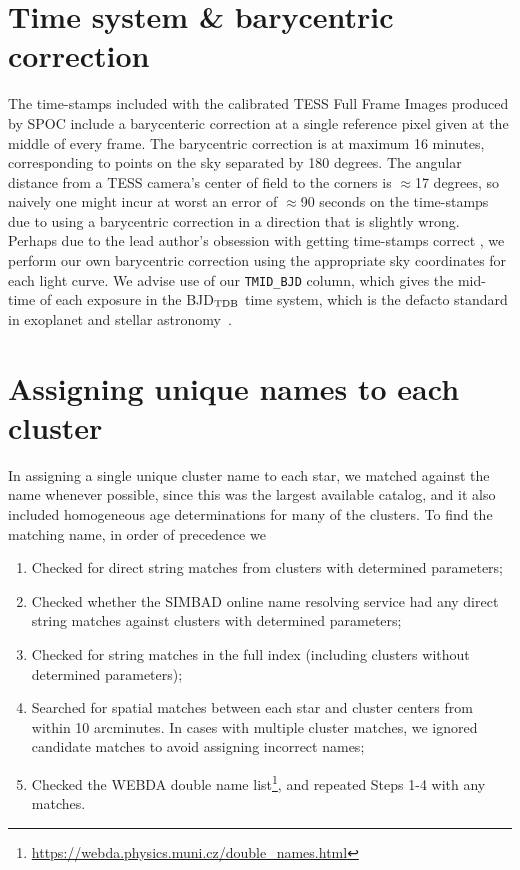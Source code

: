 \documentclass[12pt,twocolumn,tighten]{aastex62}
\begin{document}
\clearpage
\newpage

                            
 

\appendix
\section{Time system \& barycentric correction}
\label{appendix:time}

The time-stamps included with the calibrated TESS Full Frame Images
produced by SPOC include a barycenteric correction at
a single reference pixel given at the middle of every frame.
The barycentric correction is at maximum 16 minutes, corresponding to
points on the sky separated by 180 degrees.
The angular distance from a TESS camera's center of field to the corners
is $\approx$17 degrees, so naively one might incur at worst an error of
$\approx$90 seconds on the time-stamps due to using a barycentric
correction in a direction that is slightly wrong.
Perhaps due to the lead author's obsession with getting time-stamps correct 
\citep{bouma_wasp-4b_2019},
we perform our own barycentric correction using the appropriate
sky coordinates for each light curve.
We advise use of our \texttt{TMID\_BJD} column, which gives the
mid-time of each exposure in the BJD$_{\rm TDB}$ time system, which
is the defacto standard in exoplanet and stellar
astronomy~\citep{eastman_achieving_2010}.

\section{Assigning unique names to each cluster}
\label{appendix:uniquenames}

In assigning a single unique cluster name to each star, we matched
against the \citet{Kharchenko_et_al_2013} name whenever possible,
since this was the largest available catalog, and it also included
homogeneous age determinations for many of the clusters.
To find the matching name, in order of precedence we
\begin{enumerate}
  \item Checked for direct string matches from
    \citet{Kharchenko_et_al_2013} clusters with determined parameters;
  \item Checked whether the SIMBAD online name resolving service \citep{wenger_simbad_2000} had
    any direct string matches against \citet{Kharchenko_et_al_2013}
    clusters with determined parameters;
  \item Checked for string matches in the full
    \citet{Kharchenko_et_al_2013} index (including clusters without
    determined parameters);
  \item Searched for spatial matches between each star and cluster
    centers from \citet{Kharchenko_et_al_2013} within 10 arcminutes.
    In cases with multiple cluster matches, we ignored candidate
    matches to avoid assigning incorrect names;
  \item Checked the WEBDA double name
    list\footnote{\url{https://webda.physics.muni.cz/double_names.html}},
    and repeated Steps 1-4 with any matches.
\end{enumerate}
\end{document}

